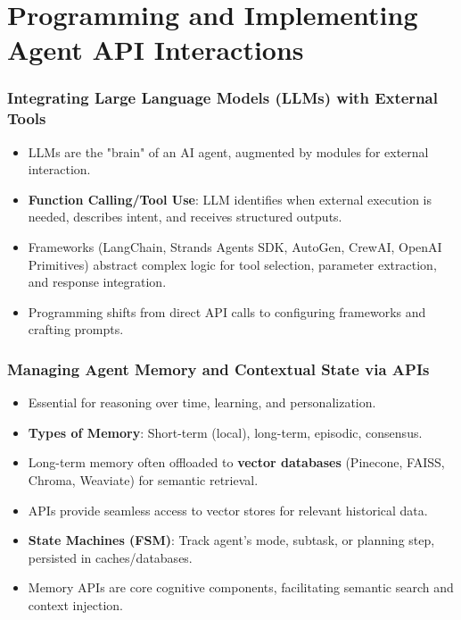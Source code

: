 \documentclass{beamer}       %
\begin{document}
\section{Programming and Implementing Agent API Interactions}

\begin{frame}
    \frametitle{Integrating Large Language Models (LLMs) with External Tools}
    \begin{itemize}
        \item LLMs are the "brain" of an AI agent, augmented by modules for external interaction.
        \item \textbf{Function Calling/Tool Use}: LLM identifies when external execution is needed, describes intent, and receives structured outputs.
        \item Frameworks (LangChain, Strands Agents SDK, AutoGen, CrewAI, OpenAI Primitives) abstract complex logic for tool selection, parameter extraction, and response integration.
        \item Programming shifts from direct API calls to configuring frameworks and crafting prompts.
    \end{itemize}
\end{frame}

\begin{frame}
    \frametitle{Managing Agent Memory and Contextual State via APIs}
    \begin{itemize}
        \item Essential for reasoning over time, learning, and personalization.
        \item \textbf{Types of Memory}: Short-term (local), long-term, episodic, consensus.
        \item Long-term memory often offloaded to \textbf{vector databases} (Pinecone, FAISS, Chroma, Weaviate) for semantic retrieval.
        \item APIs provide seamless access to vector stores for relevant historical data.
        \item \textbf{State Machines (FSM)}: Track agent's mode, subtask, or planning step, persisted in caches/databases.
        \item Memory APIs are core cognitive components, facilitating semantic search and context injection.
    \end{itemize}
\end{frame}
\end{document}
